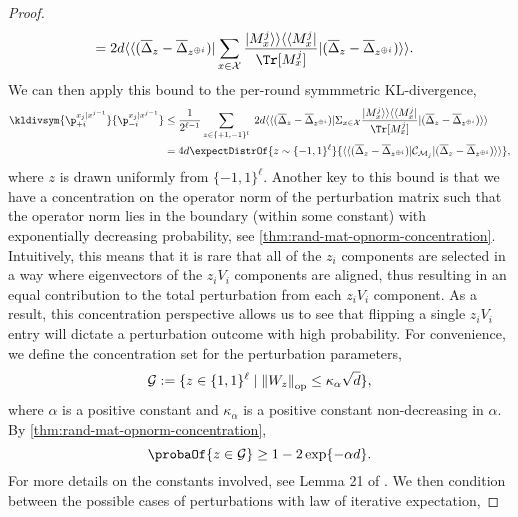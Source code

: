 \begin{proof}
\begin{align*}
   &=  2 \dims \vadj{(\barDelta_{\ptb} - \barDelta_{\ptb ^{\oplus i}})} \sum_{\out \in \mathcal{X}} \frac{\vvec{M_x^j}\vadj{M_x^j}}{\Tr[M_x^j]} \vvec{(\barDelta_{\ptb} - \barDelta_{\ptb ^{\oplus i}})}.
\end{align*}
We can then apply this bound to the per-round symmmetric KL-divergence,
\begin{align*}
   \kldivsym{\p^{\out_{j}|\out^{j-1}}_{+i}}{\p^{\out_{j}|\out^{j-1}}_{-i}}&\le \frac{1}{2^{\ell-1}} \sum_{z \in \{+1,-1\}^l} \; 2 \dims \vadj{(\barDelta_{\ptb} - \barDelta_{\ptb ^{\oplus i}})} \Sigma_{\out \in \mathcal{X}} \frac{\vvec{M_x^j}\vadj{M_x^j}}{\Tr[M_x^j]} \vvec{(\barDelta_{\ptb} - \barDelta_{\ptb ^{\oplus i}})} \\
   &= 4 \dims \expectDistrOf{z\sim\{-1, 1\}^{\ell}}{\vadj{(\barDelta_{z} - \barDelta_{z ^{\oplus i}})} \Choi_{\POVM_j} \vvec{(\barDelta_{\ptb} - \barDelta_{z ^{\oplus i}})}},
\end{align*}
where $z$ is drawn uniformly from $\{-1,1\}^{\ell}$.
Another key to this bound is that we have a concentration on the operator norm of the perturbation matrix such that the operator norm lies in the boundary (within some constant)  with exponentially decreasing probability, see \cref{thm:rand-mat-opnorm-concentration}. 
Intuitively, this means that it is rare that all of the $z_i$ components are selected in a way where eigenvectors of the $z_i V_i$ components are aligned, thus resulting in an equal contribution to the total perturbation from each $z_i V_i$ component. 
As a result, this concentration perspective allows us to see that flipping a single $z_i V_i$ entry will dictate a perturbation outcome with high probability.
For convenience, we define the concentration set for the perturbation parameters,
\begin{align}
    \mathcal{G} := \{z \in \{1,1\}^{\ell} \; | \; {\left\|W_z\right\|}_{\text{op}} \leq \kappa_\alpha \sqrt{d}\} \label{eq:concentrated-set},   
\end{align}
where $\alpha$ is a positive constant and $\kappa_\alpha$ is a positive constant non-decreasing in $\alpha$. By \cref{thm:rand-mat-opnorm-concentration},
\[
\probaOf{z \in \mathcal{G}} \geq 1 - 2\exp\{- \alpha d\}.
\]
For more details on the constants involved, see Lemma 21 of \cite{liu2024role}. 
We then condition between the possible cases of perturbations with law of iterative expectation,


\end{proof}
